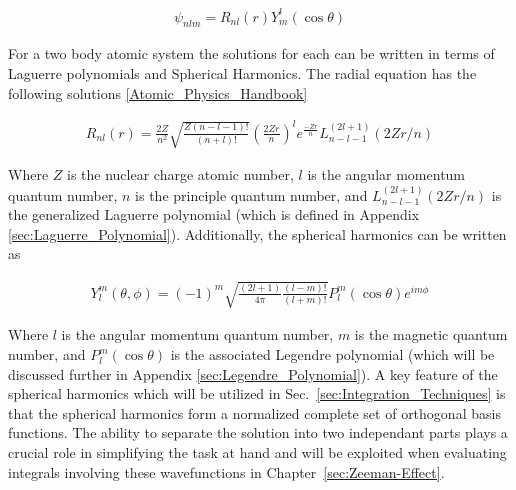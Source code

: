         \begin{align}
            \psi_{nlm} = R_{nl}(r) Y^l_m (\cos \theta)
        \end{align}

        \noindent For a two body atomic system the solutions for each can be written in terms of Laguerre polynomials and Spherical Harmonics. The radial equation has the following solutions \ref{Atomic_Physics_Handbook}

        \begin{align}
            R_{nl}(r) = \frac{2Z}{n^2} \sqrt{\frac{Z(n - l - 1)!}{(n + l)!}} \left( \frac{2Zr}{n} \right)^l e^{\frac{-Zr}{n}} L_{n - l - 1}^{(2l + 1)} \left( 2Zr/n \right) \label{eq:radial_equation}
        \end{align}

        Where $Z$ is the nuclear charge atomic number, $l$ is the angular momentum quantum number, $n$ is the principle quantum number, and $L_{n - l - 1}^{(2l + 1)} (2Zr/n)$ is the generalized Laguerre polynomial (which is defined in Appendix \ref{sec:Laguerre_Polynomial}). Additionally, the spherical harmonics can be written as

        \begin{align}
            Y^m_l (\theta, \phi) = (-1)^m \sqrt{\frac{(2l + 1)}{4 \pi}\frac{(l - m)!}{(l + m)!}} P_l^m (\cos \theta) e^{i m \phi} \label{eq:angular_equation}
        \end{align}

        Where $l$ is the angular momentum quantum number, $m$ is the magnetic quantum number, and $P_l^m (\cos \theta)$ is the associated Legendre polynomial (which will be discussed further in Appendix \ref{sec:Legendre_Polynomial}). A key feature of the spherical harmonics which will be utilized in Sec.~\ref{sec:Integration_Techniques} is that the spherical harmonics form a normalized complete set of orthogonal basis functions. The ability to separate the solution into two independant parts plays a crucial role in simplifying the task at hand and will be exploited when evaluating integrals involving these wavefunctions in Chapter~\ref{sec:Zeeman-Effect}.

